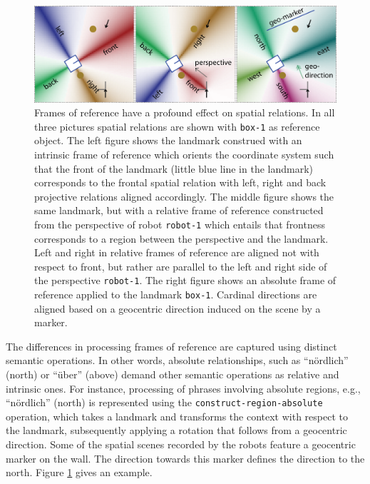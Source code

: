 \begin{figure}
\begin{center}
\includegraphics[width=1\columnwidth]{figs/space-scene-3-frames-of-reference.png}
\end{center}
\caption[Spatial relations and frames of reference.]
{Frames of reference have a profound effect on spatial relations. In all three
pictures spatial relations are shown with {\footnotesize\tt box-1} as reference object. The left
figure shows the landmark construed with an intrinsic frame of reference which
orients the coordinate system such that the front of the landmark 
(little blue line in the landmark) corresponds to the frontal spatial relation with
left, right and back projective relations aligned accordingly. The middle figure
shows the same landmark, but with a relative frame of reference constructed
from the perspective of robot {\footnotesize\tt robot-1} which entails that frontness 
corresponds to a region between the perspective and the landmark. 
Left and right in relative frames of reference are aligned not with respect to
front, but rather are parallel to the left and right side of the perspective 
{\footnotesize\tt robot-1}.
The right figure shows an absolute frame of reference applied to the landmark 
{\footnotesize\tt box-1}. Cardinal directions are aligned based on a geocentric direction
induced on the scene by a marker.}
\label{f:frames-of-reference}
\end{figure}


The differences in processing frames of reference are captured using 
distinct semantic operations. In other words, absolute relationships, 
such as ``n\"ordlich'' (north) or ``\"uber''  (above) demand other semantic 
operations as relative and intrinsic ones. For instance, 
processing of phrases involving absolute regions, e.g., ``n\"ordlich'' 
(north) is represented using the {\footnotesize\tt construct-region-absolute} operation, 
which takes a landmark and transforms the context with respect to the 
landmark, subsequently applying a rotation that follows from a geocentric direction. 
Some of the spatial scenes recorded by the robots feature
a geocentric marker on the wall. The direction towards this marker
defines the direction to the north. Figure \ref{f:frames-of-reference} 
gives an example.

